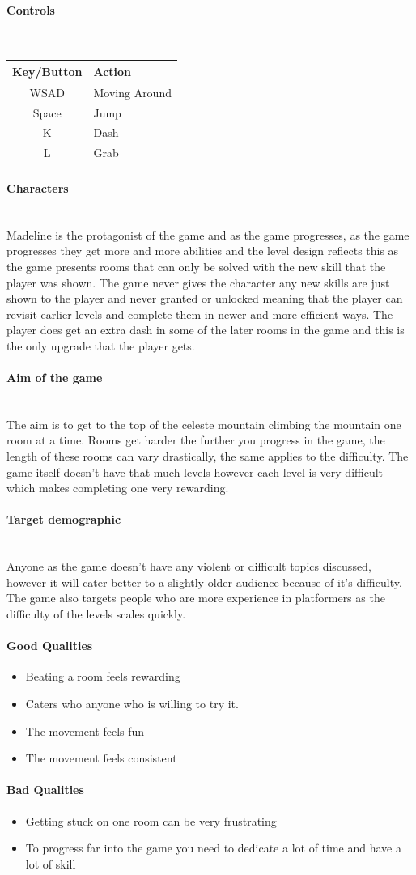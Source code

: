\documentclass{article}
\newcommand{\myparagraph}[1]{\paragraph{#1}\mbox{}\\} %
\begin{document}
\myparagraph{Controls}
\begin{tabular}{c|l}
Key/Button & Action        \\ \hline
WSAD       & Moving Around \\
Space      & Jump          \\
K          & Dash          \\
L          & Grab         
\end{tabular}

\myparagraph{Characters}
Madeline is the protagonist of the game and as the game progresses, as the game progresses they get more and more abilities and the level design reflects this as the game presents rooms that can only be solved with the new skill that the player was shown. The game never gives the character any new skills are just shown to the player and never granted or unlocked meaning that the player can revisit earlier levels and complete them in newer and more efficient ways. The player does get an extra dash in some of the later rooms in the game and this is the only upgrade that the player gets.

\myparagraph{Aim of the game}
The aim is to get to the top of the celeste mountain climbing the mountain one room at a time. Rooms get harder the further you progress in the game, the length of these rooms can vary drastically, the same applies to the difficulty. The game itself doesn't have that much levels however each level is very difficult which makes completing one very rewarding.

\myparagraph{Target demographic}
Anyone as the game doesn't have any violent or difficult topics discussed, however it will cater better to a slightly older audience because of it's difficulty. The game also targets people who are more experience in platformers as the difficulty of the levels scales quickly.

\paragraph{Good Qualities}
\begin{itemize}
\item Beating a room feels rewarding
\item Caters who anyone who is willing to try it.
\item The movement feels fun
\item The movement feels consistent
\end{itemize}

\paragraph{Bad Qualities}
\begin{itemize}
\item Getting stuck on one room can be very frustrating
\item To progress far into the game you need to dedicate a lot of time and have a lot of skill
\end{itemize}
\end{document}
